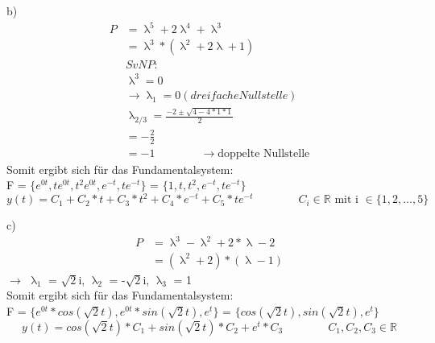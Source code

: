 \documentclass{article}
\newcommand{\tab}{\qquad \qquad}
\begin{document}
\noindent b) \\
\begin{align*}
    P &= \uplambda^5 + 2 \uplambda^4 + \uplambda^3 \\ 
      &= \uplambda^3 * (\uplambda^2 + 2\uplambda + 1) \\ 
      &SvNP: \\ 
      &\uplambda^3 = 0 \\ 
      &\rightarrow \uplambda_1 = 0 (dreifache Nullstelle) \\ 
      &\uplambda_{2/3} = \frac{-2 \pm \sqrt{4 - 4 * 1 * 1}}{2} \\ 
      &= -\frac{2}{2} \\ 
      &= -1 \tab \rightarrow \text{doppelte Nullstelle}
\end{align*}
Somit ergibt sich für das Fundamentalsystem: \\ 
F = $\{ e^{0t}, te^{0t}, t^2 e^{0t}, e^{-t}, te^{-t}\}$ = $\{ 1, t, t^2, e^{-t}, te^{-t}\}$
\[
    y(t) = C_1 + C_2 * t  + C_3 * t^2 + C_4 * e^{-t} + C_5 * te^{-t} \tab C_i \in \mathds{R} \text{ mit i } \in \{1, 2, ... , 5\}
\]

\noindent c)
\begin{align*}
    P &= \uplambda^3 - \uplambda^2 + 2 * \uplambda - 2 \\ 
      &= (\uplambda^2 + 2) * (\uplambda - 1)
\end{align*}
$\rightarrow$ $\uplambda_1$ = $\sqrt{2}$i, $\uplambda_2$ = -$\sqrt{2}$i, $\uplambda_3$ = 1 \\ 
Somit ergibt sich für das Fundamentalsystem: \\ 
F = $\{e^{0t} * cos(\sqrt{2}t), e^{0t} * sin(\sqrt{2}t), e^t\}$ = $\{cos(\sqrt{2}t), sin(\sqrt{2}t), e^t\}$
\[
    y(t) = cos(\sqrt{2}t) * C_1 +  sin(\sqrt{2}t) * C_2 +  e^t * C_3 \tab C_1, C_2, C_3 \in \mathds{R}
\]
\end{document}
